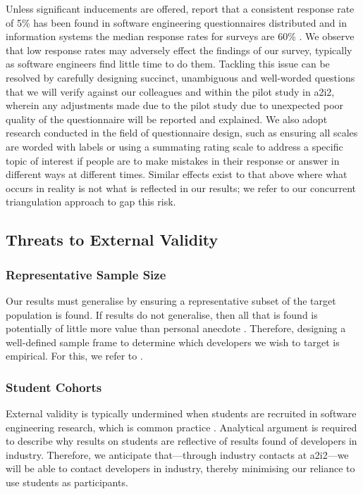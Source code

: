 Unless significant inducements are offered, \citet{Singer:2007tu} report that a consistent response rate of 5\% has been found in software engineering questionnaires distributed and in information systems the median response rates for surveys are 60\% . We observe that low response rates may adversely effect the findings of our survey, typically as software engineers find little time to do them. Tackling this issue can be resolved by carefully designing succinct, unambiguous and well-worded questions that we will verify against our colleagues and within the pilot study in \gls{a2i2}, wherein any adjustments made due to the pilot study due to unexpected poor quality of the questionnaire will be reported and explained. We also adopt research conducted in the field of questionnaire design, such as ensuring all scales are worded with labels  or using a summating rating scale  to address a specific topic of interest if people are to make mistakes in their response or answer in different ways at different times. Similar effects exist to that above where what occurs in reality is not what is reflected in our results; we refer to our concurrent triangulation approach to gap this risk.

\subsection{Threats to External Validity}

\subsubsection{Representative Sample Size}

Our results must generalise by ensuring a representative subset of the target population is found. If results do not generalise, then all that is found is potentially of little more value than personal anecdote \citep{Kitchenham:2007ux}. Therefore, designing a well-defined sample frame to determine which developers we wish to target is empirical. For this, we refer to \citet{Kitchenham:2007ux}.

\subsubsection{Student Cohorts}

External validity is typically undermined when students are recruited in software engineering research, which is common practice \citep{Easterbrook:2007ws}. Analytical argument is required to describe why results on students are reflective of results found of developers in industry. Therefore, we anticipate that---through industry contacts at \gls{a2i2}---we will be able to contact developers in industry, thereby minimising our reliance to use students as participants. 

